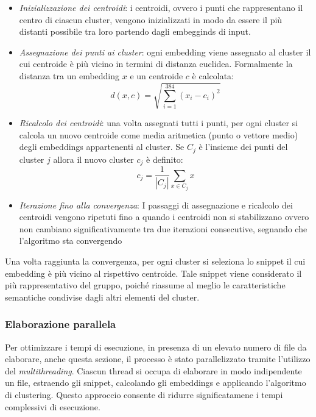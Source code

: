 \documentclass{article}
\begin{document}
\begin{itemize}
    \item \textit{Inizializzazione dei centroidi}: i centroidi, ovvero i punti che rappresentano il centro di ciascun cluster, vengono inizializzati in modo da essere il più distanti possibile tra loro partendo dagli embegginds di input.
    \item \textit{Assegnazione dei punti ai cluster}: ogni embedding viene assegnato al cluster il cui centroide è più vicino in termini di distanza euclidea. Formalmente la distanza tra un embedding $x$ e un centroide $c$ è calcolata:
    \[
    d(x, c) = \sqrt{\sum_{i=1}^{384} (x_i - c_i)^2}
    \]
    \item \textit{Ricalcolo dei centroidi}: una volta assegnati tutti i punti, per ogni cluster si calcola un nuovo centroide come media aritmetica (punto o vettore medio) degli embeddings appartenenti al cluster. Se $C_{j}$ è l'insieme dei punti del cluster $j$ allora il nuovo cluster $c_{j}$ è definito:
    \[
    c_j = \frac{1}{|C_j|} \sum_{x \in C_j} x
    \]
    \item \textit{Iterazione fino alla convergenza}: I passaggi di assegnazione e ricalcolo dei centroidi vengono ripetuti fino a quando i centroidi non si stabilizzano ovvero non cambiano significativamente tra due iterazioni consecutive, segnando che l'algoritmo sta convergendo
\end{itemize}
Una volta raggiunta la convergenza, per ogni cluster si seleziona lo snippet il cui embedding è più vicino al rispettivo centroide. Tale snippet viene considerato il più rappresentativo del gruppo, poiché riassume al meglio le caratteristiche semantiche condivise dagli altri elementi del cluster.\\

\subsubsection{Elaborazione parallela}
Per ottimizzare i tempi di esecuzione, in presenza di un elevato numero di file da elaborare, anche questa sezione, il processo è stato parallelizzato tramite l’utilizzo del \textit{multithreading}. Ciascun thread si occupa di elaborare in modo indipendente un file, estraendo gli snippet, calcolando gli embeddings e applicando l’algoritmo di clustering. Questo approccio consente di ridurre significatamene i tempi complessivi di esecuzione.
\end{document}
